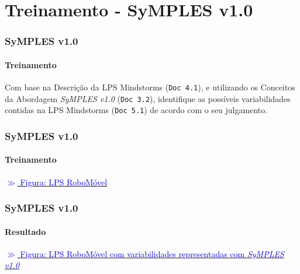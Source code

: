 \section{Treinamento - SyMPLES v1.0}

\begin{frame}
\frametitle{SyMPLES v1.0}
\framesubtitle{Treinamento}

  Com base na Descrição da LPS Mindstorms (\texttt{Doc 4.1}), e utilizando os Conceitos da Abordagem \textit{SyMPLES v1.0} (\texttt{Doc 3.2}), identifique as possíveis variabilidades contidas na LPS Mindstorms (\texttt{Doc 5.1}) de acordo com o seu julgamento.

\end{frame}

\begin{frame}
\frametitle{SyMPLES v1.0}
\framesubtitle{Treinamento}

  
  \href{run:./material/roboMovel-blocks.pdf}{\textcolor{blue}{$\gg$ Figura: LPS RoboMóvel}}

\end{frame}

\begin{frame}
\frametitle{SyMPLES v1.0}
\framesubtitle{Resultado}

  
  \href{run:./material/roboMovel-blocks-smarty.pdf}{\textcolor{blue}{$\gg$ Figura: LPS RoboMóvel com variabilidades representadas com \textit{SyMPLES v1.0}}}

\end{frame}